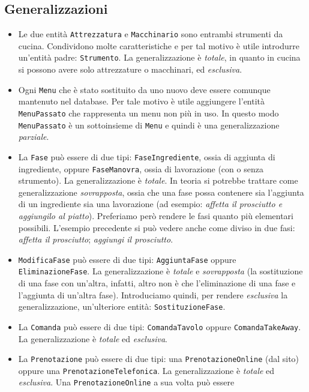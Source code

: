 \subsection{Generalizzazioni}
\begin{itemize}
\item Le due entità {\tt Attrezzatura} e {\tt Macchinario} sono entrambi
    strumenti da cucina. Condividono molte caratteristiche e per tal motivo è
    utile introdurre un'entità padre: {\tt Strumento}. La generalizzazione è
    {\it totale}, in quanto in cucina si possono avere solo attrezzature o
    macchinari, ed {\it esclusiva}.
\item Ogni {\tt Menu} che è stato sostituito da uno nuovo deve essere comunque
    mantenuto nel database. Per tale motivo è utile aggiungere l'entità
    {\tt MenuPassato} che rappresenta un menu non più in uso. In questo modo
    {\tt MenuPassato} è un sottoinsieme di {\tt Menu} e quindi è una generalizzazione
    {\it parziale}.
\item La {\tt Fase} può essere di due tipi: {\tt FaseIngrediente}, ossia di aggiunta
    di ingrediente, oppure {\tt FaseManovra}, ossia di lavorazione (con o senza strumento).
    La generalizzazione è {\it totale}. In teoria si potrebbe trattare come generalizzazione
    {\it sovrapposta}, ossia che una fase possa contenere sia l'aggiunta di un ingrediente
    sia una lavorazione (ad esempio: {\it affetta il prosciutto e aggiungilo al piatto}).
    Preferiamo però rendere le fasi quanto più elementari possibili. L'esempio precedente
    si può vedere anche come diviso in due fasi: {\it affetta il prosciutto}; {\it aggiungi il
    prosciutto}.
\item {\tt ModificaFase} può essere di due tipi: {\tt AggiuntaFase} oppure {\tt EliminazioneFase}.
    La generalizzazione è {\it totale} e {\it sovrapposta} (la sostituzione di una fase con
    un'altra, infatti, altro non è che l'eliminazione di una fase e l'aggiunta di un'altra
    fase). Introduciamo quindi, per rendere {\it esclusiva} la generalizzazione, un'ulteriore
    entità: {\tt SostituzioneFase}.
\item La {\tt Comanda} può essere di due tipi: {\tt ComandaTavolo} oppure
    {\tt ComandaTakeAway}. La generalizzazione è {\it totale} ed
    {\it esclusiva}.
\item La {\tt Prenotazione} può essere di due tipi: una {\tt PrenotazioneOnline} (dal sito)
    oppure una {\tt PrenotazioneTelefonica}. La generalizzazione è {\it totale}
    ed {\it esclusiva}. Una {\tt PrenotazioneOnline} a sua volta può essere

\end{itemize}
